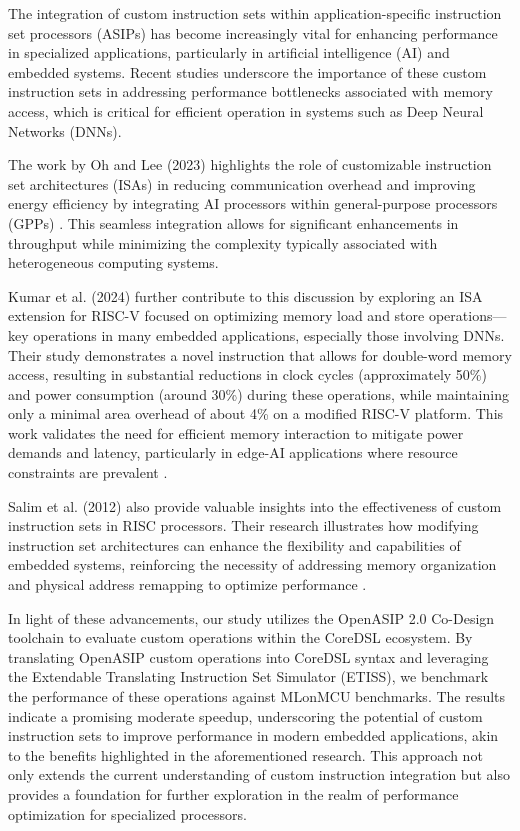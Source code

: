 The integration of custom instruction sets within application-specific instruction set processors (ASIPs) has become increasingly vital for enhancing performance in specialized applications, particularly in artificial intelligence (AI) and embedded systems. Recent studies underscore the importance of these custom instruction sets in addressing performance bottlenecks associated with memory access, which is critical for efficient operation in systems such as Deep Neural Networks (DNNs).

The work by Oh and Lee (2023) highlights the role of customizable instruction set architectures (ISAs) in reducing communication overhead and improving energy efficiency by integrating AI processors within general-purpose processors (GPPs) \cite{oh2023design}. This seamless integration allows for significant enhancements in throughput while minimizing the complexity typically associated with heterogeneous computing systems.

Kumar et al. (2024) further contribute to this discussion by exploring an ISA extension for RISC-V focused on optimizing memory load and store operations—key operations in many embedded applications, especially those involving DNNs. Their study demonstrates a novel instruction that allows for double-word memory access, resulting in substantial reductions in clock cycles (approximately 50\%) and power consumption (around 30\%) during these operations, while maintaining only a minimal area overhead of about 4\% on a modified RISC-V platform. This work validates the need for efficient memory interaction to mitigate power demands and latency, particularly in edge-AI applications where resource constraints are prevalent \cite{kumar2024implementation}.

Salim et al. (2012) also provide valuable insights into the effectiveness of custom instruction sets in RISC processors. Their research illustrates how modifying instruction set architectures can enhance the flexibility and capabilities of embedded systems, reinforcing the necessity of addressing memory organization and physical address remapping to optimize performance \cite{salim2012customized}.

In light of these advancements, our study utilizes the OpenASIP 2.0 Co-Design toolchain to evaluate custom operations within the CoreDSL ecosystem. By translating OpenASIP custom operations into CoreDSL syntax and leveraging the Extendable Translating Instruction Set Simulator (ETISS), we benchmark the performance of these operations against MLonMCU benchmarks. The results indicate a promising moderate speedup, underscoring the potential of custom instruction sets to improve performance in modern embedded applications, akin to the benefits highlighted in the aforementioned research. This approach not only extends the current understanding of custom instruction integration but also provides a foundation for further exploration in the realm of performance optimization for specialized processors.